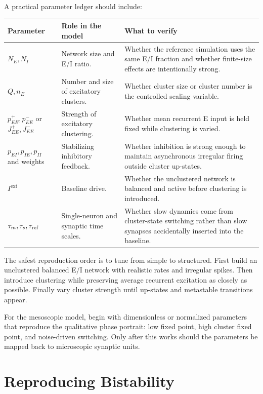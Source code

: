 A practical parameter ledger should include:
%
\begin{longtable}{@{}p{}p{}p{}@{}}
\toprule
\textbf{Parameter} & \textbf{Role in the model} & \textbf{What to verify} \\
\midrule
$N_E,N_I$ & Network size and E/I ratio. & Whether the reference simulation uses the same E/I fraction and whether finite-size effects are intentionally strong. \\
$Q,n_E$ & Number and size of excitatory clusters. & Whether cluster size or cluster number is the controlled scaling variable. \\
$p_{EE}^{+},p_{EE}^{-}$ or $J_{EE}^{+},J_{EE}^{-}$ & Strength of excitatory clustering. & Whether mean recurrent E input is held fixed while clustering is varied. \\
$p_{EI},p_{IE},p_{II}$ and weights & Stabilizing inhibitory feedback. & Whether inhibition is strong enough to maintain asynchronous irregular firing outside cluster up-states. \\
$I^{\mathrm{ext}}$ & Baseline drive. & Whether the unclustered network is balanced and active before clustering is introduced. \\
$\tau_m,\tau_s,\tau_{\text{ref}}$ & Single-neuron and synaptic time scales. & Whether slow dynamics come from cluster-state switching rather than slow synapses accidentally inserted into the baseline. \\
\bottomrule
\end{longtable}

The safest reproduction order is to tune from simple to structured. First build an unclustered balanced E/I network with realistic rates and irregular spikes. Then introduce clustering while preserving average recurrent excitation as closely as possible. Finally vary cluster strength until up-states and metastable transitions appear.

For the mesoscopic model, begin with dimensionless or normalized parameters that reproduce the qualitative phase portrait: low fixed point, high cluster fixed point, and noise-driven switching. Only after this works should the parameters be mapped back to microscopic synaptic units.

\section{Reproducing Bistability}
\label{sec:reproducing-bistability}

